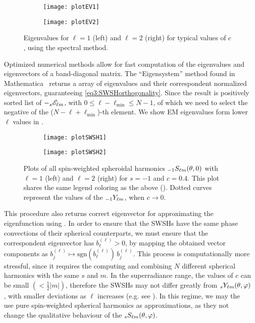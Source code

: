 \begin{figure}[h]
	\centering
	\vspace{0.2cm}
	\begin{subfigure}[c]{0.49\textwidth}
        \texttt{[image: plotEV1]}
	\end{subfigure}
	\hfill
	\begin{subfigure}[c]{0.48\textwidth}
		\texttt{[image: plotEV2]}
	\end{subfigure}
	\hfill
	\caption{Eigenvalues for $\ell=1$ (left) and $\ell=2$ (right) for typical values of $c$, using the spectral method.}
	\label{fig4:plotsEV12}
\end{figure}
Optimized numerical methods allow for fast computation of the eigenvalues and eigenvectors of a band-diagonal matrix.
The ``Eigensystem'' method found in Mathematica\texttrademark~ returns a array of eigenvalues and their correspondent normalized eigenvectors, guaranteeing \eqref{eq3:SWSHorthogonality}. Since the result is positively sorted list of $-\uu[s]{\mathscr{E}}{\ell m}$, with $0\le \ell-\ell_\mathrm{min}\le N-1$, of which we need to select the negative of the ($N-\ell+\ell_\mathrm{min}$)-th element.
We show EM eigenvalues form lower $\ell$ values in .
\begin{figure}[!b]
	\centering
	\vspace{0.2cm}
	\begin{subfigure}[c]{0.49\textwidth}
        \texttt{[image: plotSWSH1]}
	\end{subfigure}
	\hfill
	\begin{subfigure}[c]{0.49\textwidth}
		\texttt{[image: plotSWSH2]}
	\end{subfigure}
	\hfill
	\caption{Plots of all spin-weighted spheroidal harmonics $\uu[-1]{S}{\ell m}(\theta,0)$ with $\ell=1$ (left) and $\ell=2$ (right) for $s=-1$ and $c=0.4$. This plot shares the same legend coloring as the above (). Dotted curves represent the values of the $\uu[-1]{Y}{\ell m}$, when $c\to0$.}
	\label{fig4:plotSWSH12}
\end{figure}
This procedure also returns correct eigenvector for approximating the eigenfunction using .
In order to ensure that the SWSHs have the same phase convections of their spherical counterparts, we must ensure that the correspondent eigenvector has $b_\ell^{(\ell)}>0$, by mapping the obtained vector components as $b_j^{(\ell)}\mapsto \mathrm{sgn}(b_\ell^{(\ell)}) \,b_j^{(\ell)}$.
This process is computationally more stressful, since it requires the computing and combining $N$ different spherical harmonics with the same $s$ and $m$.
In the superradiance range, the values of $c$ can be small $\left(<\tfrac{1}{2}|m|\right)$, therefore the SWSHs may not differ greatly from $\uu[s]{Y}{\ell m}(\theta,\varphi)$, with smaller deviations as $\ell$ increases (e.g. see ).
In this regime, we may the use pure spin-weighted spherical harmonics as approximations, as they not change the qualitative behaviour of the $\uu[s]{S}{\ell m}(\theta,\varphi)$.

